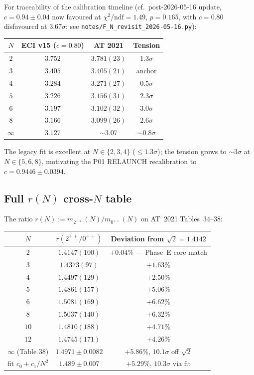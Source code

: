 \documentclass[11pt,a4paper]{amsart}
\theoremstyle{definition}
\begin{document}
For traceability of the calibration timeline (cf.\ post-2026-05-16 update,
$c=0.94 \pm 0.04$ now favoured at $\chi^{2}/\text{ndf}=1.49$, $p=0.165$,
with $c=0.80$ disfavoured at $3.67\sigma$; see
\texttt{notes/F\_N\_revisit\_2026-05-16.py}):
\begin{center}
\begin{tabular}{cccc}
\toprule
$N$ & ECI v15 ($c=0.80$) & AT 2021 & Tension \\
\midrule
$2$ & $3.752$ & $3.781(23)$ & $1.3\sigma$ \\
$3$ & $3.405$ & $3.405(21)$ & anchor \\
$4$ & $3.284$ & $3.271(27)$ & $0.5\sigma$ \\
$5$ & $3.226$ & $3.156(31)$ & $2.3\sigma$ \\
$6$ & $3.197$ & $3.102(32)$ & $3.0\sigma$ \\
$8$ & $3.166$ & $3.099(26)$ & $2.6\sigma$ \\
$\infty$ & $3.127$ & $\sim 3.07$ & $\sim 0.8\sigma$ \\
\bottomrule
\end{tabular}
\end{center}

The legacy fit is excellent at $N \in \{2, 3, 4\}$ ($\le 1.3\sigma$); the
tension grows to $\sim 3\sigma$ at $N \in \{5, 6, 8\}$, motivating the P01
RELAUNCH recalibration to $c=0.9446 \pm 0.0394$.

\subsection{Full $r(N)$ cross-$N$ table}

The ratio $r(N) := m_{2^{++}}(N)/m_{0^{++}}(N)$ on AT~2021 Tables~34--38:
\begin{center}
\begin{tabular}{ccc}
\toprule
$N$ & $r(2^{++}/0^{++})$ & Deviation from $\sqrt{2} = 1.4142$ \\
\midrule
$2$ & $1.4147(100)$ & $+0.04\%$ --- Phase~E core match \\
$3$ & $1.4373(97)$ & $+1.63\%$ \\
$4$ & $1.4497(129)$ & $+2.50\%$ \\
$5$ & $1.4861(157)$ & $+5.06\%$ \\
$6$ & $1.5081(169)$ & $+6.62\%$ \\
$8$ & $1.5037(140)$ & $+6.32\%$ \\
$10$ & $1.4810(188)$ & $+4.71\%$ \\
$12$ & $1.4745(171)$ & $+4.26\%$ \\
$\infty$ (Table 38) & $\mathbf{1.4971 \pm 0.0082}$ & $+5.86\%$, $10.1\sigma$ off $\sqrt{2}$ \\
\midrule
fit $c_{0} + c_{1}/N^{2}$ & $\mathbf{1.489 \pm 0.007}$ & $+5.29\%$, $10.3\sigma$ via fit \\
\bottomrule
\end{tabular}
\end{center}
\end{document}
